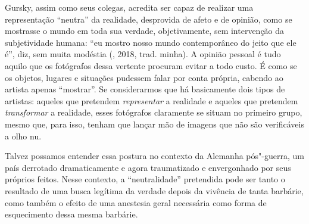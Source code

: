 Gursky, assim como seus colegas, acredita ser capaz de realizar uma
representação ``neutra'' da realidade, desprovida de afeto e de opinião,
como se mostrasse o mundo em toda sua verdade, objetivamente, sem
intervenção da subjetividade humana: ``eu mostro nosso mundo
contemporâneo do jeito que ele é'', diz, sem muita modéstia (,
2018, trad. minha). A opinião pessoal é tudo aquilo que os fotógrafos
dessa vertente procuram evitar a todo custo. É como se os objetos,
lugares e situações pudessem falar por conta própria, cabendo ao artista
apenas ``mostrar''. Se considerarmos que há basicamente dois tipos de
artistas: aqueles que pretendem \emph{representar} a realidade e aqueles
que pretendem \emph{transformar} a realidade, esses fotógrafos
claramente se situam no primeiro grupo, mesmo que, para isso, tenham que
lançar mão de imagens que não são verificáveis a olho nu.

Talvez possamos entender essa postura no contexto da Alemanha
pós"-guerra, um país derrotado dramaticamente e agora traumatizado e
envergonhado por seus próprios feitos. Nesse contexto, a
``neutralidade'' pretendida pode ser tanto o resultado de uma busca
legítima da verdade depois da vivência de tanta barbárie, como também o
efeito de uma anestesia geral necessária como forma de esquecimento
dessa mesma barbárie.

